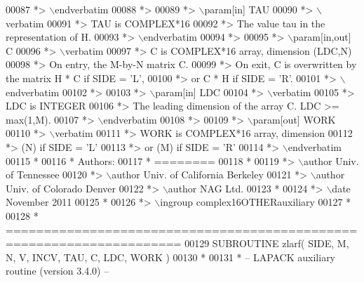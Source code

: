 \begin{DoxyCode}
00087 \textcolor{comment}{*> \(\backslash\)endverbatim}
00088 \textcolor{comment}{*>}
00089 \textcolor{comment}{*> \(\backslash\)param[in] TAU}
00090 \textcolor{comment}{*> \(\backslash\)verbatim}
00091 \textcolor{comment}{*>          TAU is COMPLEX*16}
00092 \textcolor{comment}{*>          The value tau in the representation of H.}
00093 \textcolor{comment}{*> \(\backslash\)endverbatim}
00094 \textcolor{comment}{*>}
00095 \textcolor{comment}{*> \(\backslash\)param[in,out] C}
00096 \textcolor{comment}{*> \(\backslash\)verbatim}
00097 \textcolor{comment}{*>          C is COMPLEX*16 array, dimension (LDC,N)}
00098 \textcolor{comment}{*>          On entry, the M-by-N matrix C.}
00099 \textcolor{comment}{*>          On exit, C is overwritten by the matrix H * C if SIDE = 'L',}
00100 \textcolor{comment}{*>          or C * H if SIDE = 'R'.}
00101 \textcolor{comment}{*> \(\backslash\)endverbatim}
00102 \textcolor{comment}{*>}
00103 \textcolor{comment}{*> \(\backslash\)param[in] LDC}
00104 \textcolor{comment}{*> \(\backslash\)verbatim}
00105 \textcolor{comment}{*>          LDC is INTEGER}
00106 \textcolor{comment}{*>          The leading dimension of the array C. LDC >= max(1,M).}
00107 \textcolor{comment}{*> \(\backslash\)endverbatim}
00108 \textcolor{comment}{*>}
00109 \textcolor{comment}{*> \(\backslash\)param[out] WORK}
00110 \textcolor{comment}{*> \(\backslash\)verbatim}
00111 \textcolor{comment}{*>          WORK is COMPLEX*16 array, dimension}
00112 \textcolor{comment}{*>                         (N) if SIDE = 'L'}
00113 \textcolor{comment}{*>                      or (M) if SIDE = 'R'}
00114 \textcolor{comment}{*> \(\backslash\)endverbatim}
00115 \textcolor{comment}{*}
00116 \textcolor{comment}{*  Authors:}
00117 \textcolor{comment}{*  ========}
00118 \textcolor{comment}{*}
00119 \textcolor{comment}{*> \(\backslash\)author Univ. of Tennessee }
00120 \textcolor{comment}{*> \(\backslash\)author Univ. of California Berkeley }
00121 \textcolor{comment}{*> \(\backslash\)author Univ. of Colorado Denver }
00122 \textcolor{comment}{*> \(\backslash\)author NAG Ltd. }
00123 \textcolor{comment}{*}
00124 \textcolor{comment}{*> \(\backslash\)date November 2011}
00125 \textcolor{comment}{*}
00126 \textcolor{comment}{*> \(\backslash\)ingroup complex16OTHERauxiliary}
00127 \textcolor{comment}{*}
00128 \textcolor{comment}{*  =====================================================================}
00129 \textcolor{keyword}{      SUBROUTINE }zlarf( SIDE, M, N, V, INCV, TAU, C, LDC, WORK )
00130 \textcolor{comment}{*}
00131 \textcolor{comment}{*  -- LAPACK auxiliary routine (version 3.4.0) --}

\end{DoxyCode}
